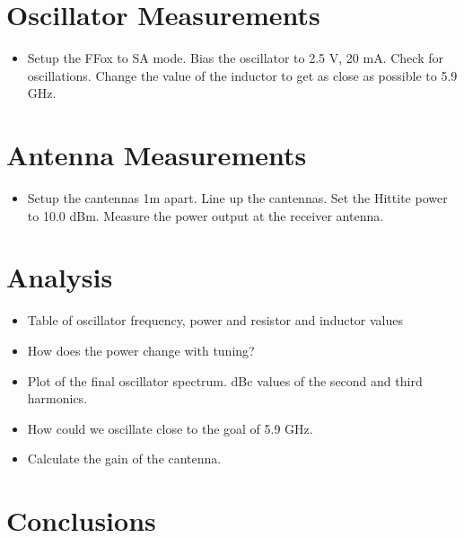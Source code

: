 \documentclass{article}
\begin{document}
\section*{Oscillator Measurements}\label{sec:ampdesign}

\begin{itemize}
    \item Setup the FFox to SA mode. Bias the oscillator to 2.5 V, 20 mA. Check for oscillations. Change the value of the inductor to get as close as possible to 5.9 GHz.
\end{itemize}

\section*{Antenna Measurements}\label{sec:testing}

\begin{itemize}
    \item Setup the cantennas 1m apart. Line up the cantennas. Set the Hittite power to 10.0 dBm. Measure the power output at the receiver antenna.
\end{itemize}

\section*{Analysis}\label{sec:analysis}

\begin{itemize}
    \item Table of oscillator frequency, power and resistor and inductor values

    \item How does the power change with tuning?

    \item Plot of the final oscillator spectrum. dBc values of the second and third harmonics.

    \item How could we oscillate close to the goal of 5.9 GHz.

    \item Calculate the gain of the cantenna.

\end{itemize}

\section*{Conclusions}
\end{document}
